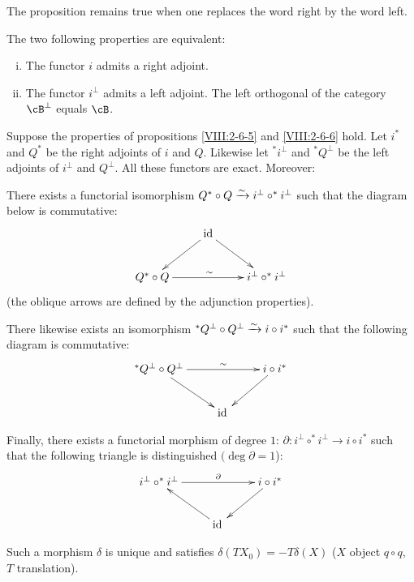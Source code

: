 The proposition remains true when one replaces the word right by the word
left. 





\begin{proposition}\label{VIII:2-6-6}
The two following properties are equivalent:
\begin{enumerate}[(i)]
  \item The functor $i$ admits a right adjoint.
  \item The functor $i^\bot$ admits a left adjoint. The left
    orthogonal of the category $\cB^\bot$ equals $\cB$. 
\end{enumerate}
\end{proposition}





\begin{proposition}\label{VIII:2-6-7}
Suppose the properties of propositions \ref{VIII:2-6-5} and
\ref{VIII:2-6-6} hold. Let $i^\ast$ and $Q^\ast$ be the right adjoints of $i$ and
$Q$. Likewise let $^\ast i^\bot$ and $^\ast Q^\bot$ be the left adjoints
of $i^\bot$ and $Q^\bot$. All these functors are exact. Moreover:

There exists a functorial isomorphism
$Q^\ast\circ Q\xrightarrow\sim i^\bot\circ ^\ast i^\bot$ such that the diagram below
is commutative: 
\[\xymatrix{
  & \operatorname{id} \ar[dl] \ar[dr] \\
  Q^\ast \circ Q \ar[rr]^\sim 
    & & i^\bot\circ ^\ast i^\bot 
}\]
(the oblique arrows are defined by the adjunction properties).

There likewise exists an isomorphism
$^\ast Q^\bot \circ Q^\bot \xrightarrow\sim i\circ i^\ast$ such that the following diagram is
commutative: 
\[\xymatrix{
  ^\ast Q^\bot\circ Q^\bot \ar[rr]^-\sim \ar[dr] 
    & & i\circ i^\ast \ar[dl] \\
  & \operatorname{id}{}
}\]

Finally, there exists a functorial morphism of degree $1$:
$\partial:i^\bot\circ ^\ast i^\bot \to i\circ i^\ast$ such that the following
triangle is distinguished $(\deg\partial=1$): 
\[\xymatrix{
  i^\bot \circ ^\ast i^\bot \ar[rr]^-\partial 
    & & i\circ i^\ast \ar[dl] \\
  & \operatorname{id}{} \ar[ul] 
}\]

Such a morphism $\delta$ is unique and satisfies
$\delta(T X_0) = - T \delta(X)$ ($X$ object $q\circ q$, $T$ translation).
\end{proposition}















